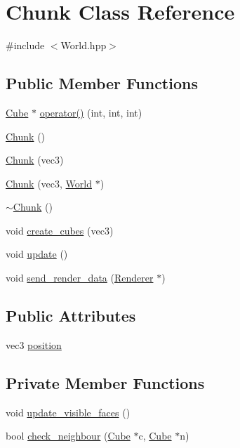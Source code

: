 \hypertarget{classChunk}{}\section{Chunk Class Reference}
\label{classChunk}


{\ttfamily \#include $<$World.\+hpp$>$}

\subsection*{Public Member Functions}
\begin{DoxyCompactItemize}
\item 
\mbox{\hyperlink{classCube}{Cube}} $\ast$ \mbox{\hyperlink{classChunk_aa95ae810408dd656b8b750c6baf42e1d}{operator()}} (int, int, int)
\item 
\mbox{\hyperlink{classChunk_acc32e1562cad6664c98ee07edecdbdf9}{Chunk}} ()
\item 
\mbox{\hyperlink{classChunk_ad48366bd231dc1fe236ddf38e15b40bf}{Chunk}} (vec3)
\item 
\mbox{\hyperlink{classChunk_a2f6fc0e3c9306d4dd7209b236305c7ad}{Chunk}} (vec3, \mbox{\hyperlink{classWorld}{World}} $\ast$)
\item 
\mbox{\hyperlink{classChunk_ad21b515f41c9a1d21740b9e7e3f8eede}{$\sim$\+Chunk}} ()
\item 
void \mbox{\hyperlink{classChunk_af2b7c93af8b369467a86687e2afde029}{create\+\_\+cubes}} (vec3)
\item 
void \mbox{\hyperlink{classChunk_a1cbe00cb7683d46b86908f29fe066f5b}{update}} ()
\item 
void \mbox{\hyperlink{classChunk_aca780fcf47255bd05242ba1d144d0672}{send\+\_\+render\+\_\+data}} (\mbox{\hyperlink{classRenderer}{Renderer}} $\ast$)
\end{DoxyCompactItemize}
\subsection*{Public Attributes}
\begin{DoxyCompactItemize}
\item 
vec3 \mbox{\hyperlink{classChunk_a7dd254022526601cff0078424b3c1a9e}{position}}
\end{DoxyCompactItemize}
\subsection*{Private Member Functions}
\begin{DoxyCompactItemize}
\item 
void \mbox{\hyperlink{classChunk_a14e0df6744414d474f44bc562c0883bb}{update\+\_\+visible\+\_\+faces}} ()
\item 
bool \mbox{\hyperlink{classChunk_a6156a96628c9077e34edb0da50f4e4d2}{check\+\_\+neighbour}} (\mbox{\hyperlink{classCube}{Cube}} $\ast$c, \mbox{\hyperlink{classCube}{Cube}} $\ast$n)
\end{DoxyCompactItemize}
